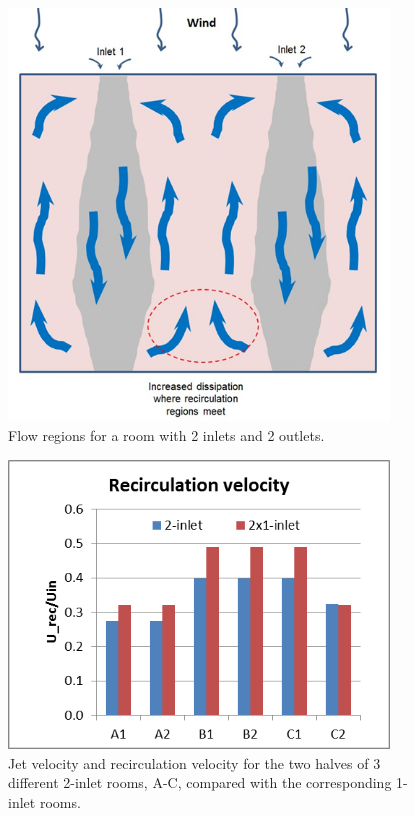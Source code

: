 {\begin{figure}[hbtp] %
\centering
\includegraphics[width=0.9\textwidth, height=0.9\textheight, keepaspectratio=true]{media/image2660.png}
\caption{Flow regions for a room with 2 inlets and 2 outlets. \protect \label{fig:flow-regions-for-a-room-with-2-inlets-and-2}}
\end{figure}

\begin{figure}[hbtp] %
\centering
\includegraphics[width=0.9\textwidth, height=0.9\textheight, keepaspectratio=true]{media/image2662.png}
\caption{Jet velocity and recirculation velocity for the two halves of 3 different 2-inlet rooms, A-C, compared with the corresponding 1-inlet rooms. \protect \label{fig:jet-velocity-and-recirculation-velocity-for}}
\end{figure}

}
